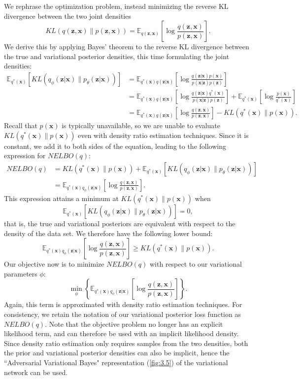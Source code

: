 \documentclass[honours,12pt, twoside]{unswthesis}
\newcommand{\E}{\mathbb{E}}
\numberwithin{equation}{section}
\theoremstyle{definition}
\begin{document}
We rephrase the optimization problem, instead minimizing the reverse KL divergence between the two joint densities \citep{tran} \[KL(q(\bm{z},\bm{x})\|p(\bm{z},\bm{x}))=\E_{q(\bm{z},\bm{x})}\left[\log\frac{q(\bm{z},\bm{x})}{p(\bm{z},\bm{x})}\right].\] We derive this by applying Bayes' theorem to the reverse KL divergence between the true and variational posterior densities, this time formulating the joint densities:
\begin{align*}
\mathbb{E}_{q^*(\bm{x})}\left[KL(q_\phi(\bm{z}|\bm{x})\|p_\theta (\bm{z}|\bm{x}))\right]&=\mathbb{E}_{q^*(\bm{x})q(\bm{z}|\bm{x})}\left[\log \frac{q(\bm{z}|\bm{x})p(\bm{x})}{p(\bm{x}|\bm{z})p(\bm{z})}\right]\\
&=\mathbb{E}_{q^*(\bm{x})q(\bm{z}|\bm{x})}\left[\log \frac{q(\bm{z}|\bm{x})q^*(\bm{x})}{p(\bm{x}|\bm{z})p(\bm{z})}\right]+\mathbb{E}_{q^*(\bm{x})}\left[\log \frac{p(\bm{x})}{q^*(\bm{x})}\right]\\
&= \mathbb{E}_{q^*(\bm{x})q(\bm{z}|\bm{x})}\left[\log \frac{q(\bm{z},\bm{x})}{p(\bm{z},\bm{x})}\right]-KL(q^*(\bm{x})\|p(\bm{x})).
\end{align*}
Recall that $p(\bm{x})$ is typically unavailable, so we are unable to evaluate $KL(q^*(\bm{x})\|p(\bm{x}))$ even with density ratio estimation techniques. Since it is constant, we add it to both sides of the equation, leading to the following expression for $NELBO(q)$:
\begin{align*}
NELBO(q) &= KL(q^*(\bm{x})\|p(\bm{x}))+\mathbb{E}_{q^*(\bm{x})}\left[KL(q_\phi(\bm{z}|\bm{x})\|p_\theta(\bm{z}|\bm{x}))\right]\\
&=\mathbb{E}_{q^*(\bm{x})q_\phi(\bm{z}|\bm{x})}\left[\log \frac{q(\bm{z},\bm{x})}{p(\bm{z},\bm{x})}\right].
\end{align*}
This expression attains a minimum at $KL(q^*(\bm{x})\|p(\bm{x}))$ when \[\mathbb{E}_{q^*(\bm{x})}\left[KL(q_\phi(\bm{z}|\bm{x})\|p_\theta(\bm{z}|\bm{x}))\right]=0,\] that is, the true and variational posteriors are equivalent with respect to the density of the data set. We therefore have the following lower bound:
\[\mathbb{E}_{q^*(\bm{x})q_\phi(\bm{z}|\bm{x})}\left[\log \frac{q(\bm{z},\bm{x})}{p(\bm{z},\bm{x})}\right]\geq KL(q^*(\bm{x})\|p(\bm{x})).\]
Our objective now is to minimize $NELBO(q)$ with respect to our variational parameters $\phi$:
\begin{equation}
\min_\phi \left\lbrace\mathbb{E}_{q^*(\bm{x})q_\phi(\bm{z}|\bm{x})}\left[\log \frac{q(\bm{z},\bm{x})}{p(\bm{z},\bm{x})}\right]\right\rbrace.
\end{equation}
Again, this term is approximated with density ratio estimation techniques. For consistency, we retain the notation of our variational posterior loss function as $NELBO(q)$. Note that the objective problem no longer has an explicit likelihood term, and can therefore be used with an implicit likelihood density. Since density ratio estimation only requires samples from the two densities, both the prior and variational posterior densities can also be implicit, hence the ``Adversarial Variational Bayes" representation (\autoref{fig:3.5}) of the variational network can be used.
\end{document}
